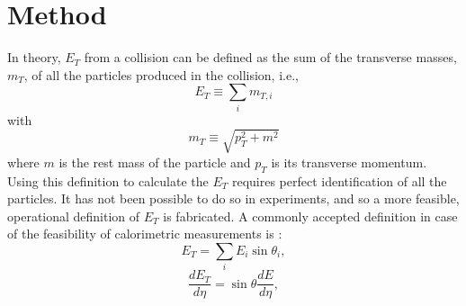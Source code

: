 \chapter{Method} \label{ch:method}




In theory, $E_{T}$ from a collision can be defined as the sum of the transverse masses, $m_{T}$, of all the particles produced in the collision, i.e.,
\begin{equation}\label{eqn:ETDefTheory}
E_{T}\equiv\sum_{i}m_{T,i}
\end{equation}
with
\begin{equation}\label{eqn:mT}
m_{T}\equiv\sqrt{p_{T}^{2}+m^2}
\end{equation}
where $m$ is the rest mass of the particle and $p_{T}$ is its transverse momentum. Using this definition to calculate the $E_{T}$ requires perfect identification of all the particles. It has not been possible to do so in experiments, and so a more feasible, operational definition of $E_{T}$ is fabricated. A commonly accepted definition in case of the feasibility of calorimetric measurements is \cite{PhysRevC.89.044905, 1742-6596-458-1-012024}:
\begin{equation}\label{eqn:ETDefSum}
E_{T} = \sum_{i}E_{i}\sin{\theta_{i}},
\end{equation}
\begin{equation}\label{eqn:dETdEta}
\frac{dE_{T}}{d\eta}=\sin{\theta}\frac{dE}{d\eta},
\end{equation}

